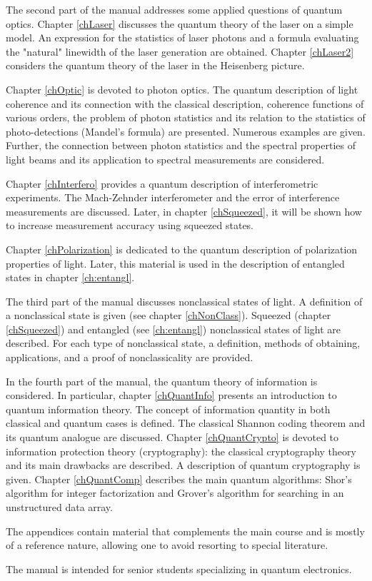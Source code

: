 The second part of the manual addresses some applied questions of quantum optics. Chapter \ref{chLaser} discusses the quantum theory of the laser on a simple model. An expression for the statistics of laser photons and a formula evaluating the "natural" linewidth of the laser generation are obtained.
Chapter \ref{chLaser2} considers the quantum theory of the laser in the Heisenberg picture.

Chapter \ref{chOptic} is devoted to photon optics. The quantum description of light coherence and its connection with the classical description, coherence functions of various orders, the problem of photon statistics and its relation to the statistics of photo-detections (Mandel's formula) are presented. Numerous examples are given. Further, the connection between photon statistics and the spectral properties of light beams and its application to spectral measurements are considered.

Chapter \ref{chInterfero} provides a quantum description of interferometric experiments. The Mach-Zehnder interferometer and the error of interference measurements are discussed. Later, in chapter \ref{chSqueezed}, it will be shown how to increase measurement accuracy using squeezed states.

Chapter \ref{chPolarization} is dedicated to the quantum description of polarization properties of light. Later, this material is used in the description of entangled states in chapter \ref{ch:entangl}.

The third part of the manual discusses nonclassical states of light. A definition of a nonclassical state is given (see chapter \ref{chNonClass}). Squeezed (chapter \ref{chSqueezed}) and entangled (see \autoref{ch:entangl}) nonclassical states of light are described. For each type of nonclassical state, a definition, methods of obtaining, applications, and a proof of nonclassicality are provided.

In the fourth part of the manual, the quantum theory of information is considered. In particular, chapter \ref{chQuantInfo} presents an introduction to quantum information theory. The concept of information quantity in both classical and quantum cases is defined. The classical Shannon coding theorem and its quantum analogue are discussed. Chapter \ref{chQuantCrypto} is devoted to information protection theory (cryptography): the classical cryptography theory and its main drawbacks are described. A description of quantum cryptography is given. Chapter \ref{chQuantComp} describes the main quantum algorithms: Shor's algorithm for integer factorization and Grover's algorithm for searching in an unstructured data array.

The appendices contain material that complements the main course and is mostly of a reference nature, allowing one to avoid resorting to special literature.

The manual is intended for senior students specializing in quantum electronics.